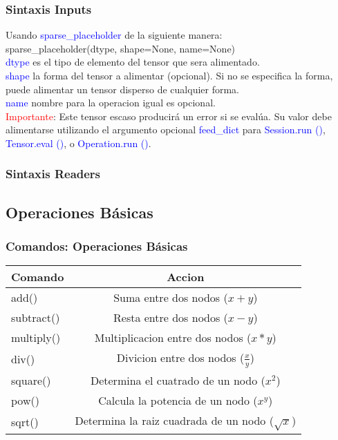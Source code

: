 \documentclass{beamer}
\begin{document}
\newpage
\begin{frame}\frametitle{Sintaxis Inputs}
Usando \textcolor{blue}{sparse\_placeholder} de la siguiente manera:\\
sparse\_placeholder(dtype, shape=None, name=None)\\
\vspace{2.5mm}
\textcolor{blue}{dtype} es el tipo de elemento del tensor que sera alimentado.\\
\vspace{2.5mm}
\textcolor{blue}{shape} la forma del tensor a alimentar (opcional). Si no se especifica la forma, puede alimentar un tensor disperso de cualquier forma.\\
\vspace{2.5mm}
\textcolor{blue}{name} nombre para la operacion igual es opcional.\\
\vspace{5mm}
\textcolor{red}{Importante}: Este tensor escaso producirá un error si se evalúa. Su valor debe alimentarse utilizando el argumento opcional \textcolor{blue}{feed\_dict} para \textcolor{blue}{Session.run ()}, \textcolor{blue}{Tensor.eval ()}, o \textcolor{blue}{Operation.run ()}.
\end{frame}

\newpage
\begin{frame}\frametitle{Sintaxis Readers}

\end{frame}

\newpage
\subsection{Operaciones Básicas}
\begin{frame}\frametitle{Comandos: Operaciones Básicas}
\begin{tabular}{|l|c|}
\hline
Comando & Accion\\ \hline
add() & Suma entre dos nodos ($x + y$)\\ \hline
subtract() & Resta entre dos nodos ($x - y$)\\ \hline
multiply() & Multiplicacion entre dos nodos ($x * y$)\\ \hline
div() & Divicion entre dos nodos ($\frac{x}{y}$)\\ \hline
square() & Determina el cuatrado de un nodo ($x^{2}$)\\ \hline
pow() & Calcula la potencia de un nodo ($x^{y}$)\\ \hline
sqrt() & Determina la raiz cuadrada de un nodo ($\sqrt{x}$)\\ \hline
\end{tabular}
\end{frame}
\end{document}
